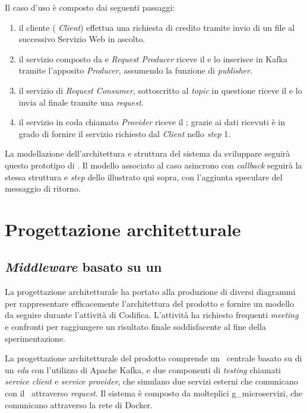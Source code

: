 \noindent
Il caso d'uso è composto dai seguenti passaggi:
\begin{enumerate}
  \item il cliente (\textit{ Client}) effettua una richiesta di credito tramite invio di un file  al successivo Servizio Web in ascolto.
  \item il servizio composto da   e \textit{Request Producer} riceve il  e lo inserisce in Kafka tramite l'apposito \textit{Producer}, assumendo la funzione di \textit{publisher}.
  \item il servizio di \textit{Request Consumer}, sottoscritto al \textit{topic} in questione riceve il  e lo invia al  finale tramite una  \textit{request}.
  \item il servizio in coda chiamato  \textit{Provider} riceve il ; grazie ai dati ricevuti è in grado di fornire il servizio richiesto dal \textit{Client} nello \textit{step} 1.
\end{enumerate}

La modellazione dell'architettura e struttura del sistema da sviluppare seguirà questo prototipo di .
Il modello associato al caso asincrono con \textit{callback} seguirà la stessa struttura e \textit{step} dello  illustrato qui sopra, con l'aggiunta speculare del messaggio di ritorno.

\section{Progettazione architetturale}\label{sec:progettazione}
\subsection{\textit{Middleware} basato su un }

La progettazione architetturale ha portato alla produzione di diversi diagrammi  per rappresentare efficacemente l'architettura del prodotto e fornire un modello da seguire durante l'attività di Codifica.
L'attività ha richiesto frequenti \textit{meeting} e confronti per raggiungere un risultato finale soddisfacente al fine della sperimentazione.

La progettazione architetturale del prodotto comprende un \middleware\ centrale basato su di un \textit{\acrlong{eda}} con l'utilizzo di Apache Kafka, e due componenti di \textit{testing} chiamati \textit{service client} e \textit{service provider}, che simulano due servizi esterni che comunicano con il \middleware\ attraverso  \textit{request}.
Il sistema è composto da molteplici \gls{g_microservizi}, che comunicano attraverso la rete di Docker.


